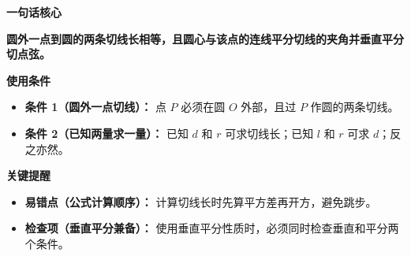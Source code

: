 \begin{summarybox}
	\textbf{\textcolor{CSummary}{一句话核心}}

	\textbf{圆外一点到圆的两条切线长相等，且圆心与该点的连线平分切线的夹角并垂直平分切点弦。}

	\medskip
	\textbf{\textcolor{CSummary}{使用条件}}
	\begin{itemize}[leftmargin=*, itemsep=0.5em, topsep=0.4em]
		\item \textbf{条件 1（圆外一点切线）：} 点 $P$ 必须在圆 $O$ 外部，且过 $P$ 作圆的两条切线。
		\item \textbf{条件 2（已知两量求一量）：} 已知 $d$ 和 $r$ 可求切线长；已知 $l$ 和 $r$ 可求 $d$；反之亦然。
	\end{itemize}

	\medskip
	\textbf{\textcolor{CSummary}{关键提醒}}
	\begin{itemize}[leftmargin=*, itemsep=0.5em, topsep=0.4em]
		\item \textbf{易错点（公式计算顺序）：} 计算切线长时先算平方差再开方，避免跳步。
		\item \textbf{检查项（垂直平分兼备）：} 使用垂直平分性质时，必须同时检查垂直和平分两个条件。
	\end{itemize}
\end{summarybox}
